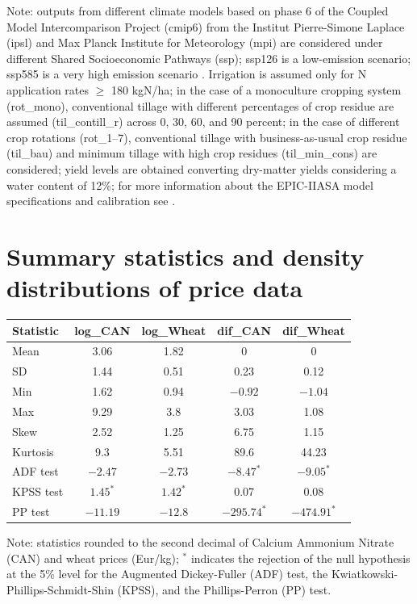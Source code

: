 \documentclass[12pt,a4paper]{article}
\begin{document}
\footnotesize
Note: outputs from different climate models based on phase 6 of the Coupled Model Intercomparison Project (cmip6) from the Institut Pierre-Simone Laplace (ipsl) and Max Planck Institute for Meteorology (mpi) are considered under different Shared Socioeconomic Pathways (ssp); ssp126 is a low-emission scenario; ssp585 is a very high emission scenario \citep{ONeill2014}. Irrigation is assumed only for N application rates $\geq$ 180 kgN/ha; in the case of a monoculture cropping system (rot\_mono), conventional tillage with different percentages of crop residue are assumed (til\_contill\_r) across 0, 30, 60, and 90 percent; in the case of different crop rotations (rot\_1--7), conventional tillage with business-as-usual crop residue (til\_bau) and minimum tillage with high crop residues (til\_min\_cons) are considered; yield levels are obtained converting dry-matter yields considering a water content of 12\%; for more information about the EPIC-IIASA model specifications and calibration see \citet{Balkovic2013}.
\normalsize

\newpage
\section{Summary statistics and density distributions of price data}
\label{annex:price}

\begin{table}[H]
\centering
\begin{tabular}{lcccc}
\toprule
Statistic & log\_CAN & log\_Wheat & dif\_CAN & dif\_Wheat \\
\midrule
Mean & 3.06 & 1.82 & 0 & 0 \\
SD & 1.44 & 0.51 & 0.23 & 0.12 \\
Min & 1.62 & 0.94 & $-0.92$ & $-1.04$ \\
Max & 9.29 & 3.8 & 3.03 & 1.08 \\
Skew & 2.52 & 1.25 & 6.75 & 1.15 \\
Kurtosis & 9.3 & 5.51 & 89.6 & 44.23 \\
ADF test & $-2.47$ & $-2.73$ & $-8.47^{*}$ & $-9.05^{*}$ \\
KPSS test & $1.45^{*}$ & $1.42^{*}$ & 0.07 & 0.08 \\
PP test & $-11.19$ & $-12.8$ & $-295.74^{*}$ & $-474.91^{*}$ \\
\bottomrule
\end{tabular}
\end{table}

\footnotesize
Note: statistics rounded to the second decimal of Calcium Ammonium Nitrate (CAN) and wheat prices (Eur/kg); $^{*}$ indicates the rejection of the null hypothesis at the 5\% level for the Augmented Dickey-Fuller (ADF) test, the Kwiatkowski-Phillips-Schmidt-Shin (KPSS), and the Phillips-Perron (PP) test.
\normalsize
\end{document}
